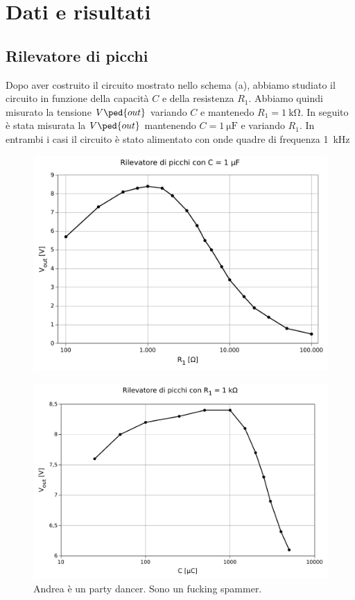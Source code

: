 \section*{Dati e risultati}

\subsection*{Rilevatore di picchi}

Dopo aver costruito il circuito mostrato nello schema (a), abbiamo studiato il circuito in funzione della capacità
$C$ e della resistenza $R_1$. Abbiamo quindi misurato la tensione $V\ped{out}$ variando $C$ e mantenedo $R_1 = \SI{1}{\kilo\ohm}$.
In seguito è stata misurata la $V\ped{out}$ mantenendo $C = \SI{1}{\micro\farad}$ e variando $R_1$.
In entrambi i casi il circuito è stato alimentato con onde quadre di frequenza \SI{1}{\kilo\hertz}

\begin{figure}
    \includegraphics[scale=0.7]{capacita.pdf}
    \caption{}
    \label{fig:capacita}
\end{figure}

\begin{figure}
    \includegraphics[scale=0.7]{resistenza.pdf}
    \caption{Andrea è un party dancer. Sono un fucking spammer.}
    \label{fig:resistenza}
\end{figure}

